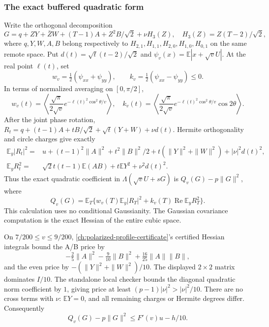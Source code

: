 \subsubsection{The exact buffered quadratic form}
Write the orthogonal decomposition
\[
 G=q+ZY+\bar ZW+(T-1)A+Z^2B/\sqrt2+\nu H_3(Z),\quad
 H_3(Z)=Z(T-2)/\sqrt2,
\]
where $q,Y,W,A,B$ belong respectively to
$H_{2,1},H_{1,1},H_{2,0},H_{1,0},H_{0,1}$ on the same remote space.
Put $d(t)=\sqrt t(t-2)/\sqrt2$ and
$\psi_v(x)=\mathbb E|x+\sqrt vU|$. At the real point $\ell(t)$, set
\[
 w_v=\tfrac12(\psi_{xx}+\psi_{yy}),\qquad
 k_v=\tfrac12(\psi_{xx}-\psi_{yy})\le0.
\]
In terms of normalized averaging on $[0,\pi/2]$,
\[
 w_v(t)=\left\langle\frac{\sqrt\pi}{2\sqrt v}
 e^{-\ell(t)^2\cos^2\theta/v}\right\rangle,
 \quad k_v(t)=\left\langle\frac{\sqrt\pi}{2\sqrt v}
 e^{-\ell(t)^2\cos^2\theta/v}\cos2\theta\right\rangle.
\]
After the joint phase rotation,
$R_t=q+(t-1)A+tB/\sqrt2+\sqrt t(Y+W)+\nu d(t)$.
Hermite orthogonality and circle charges give exactly
\begin{align*}
 \mathbb E_y|R_t|^2={}&u+(t-1)^2\|A\|^2+t^2\|B\|^2/2
 +t(\|Y\|^2+\|W\|^2)+|\nu|^2d(t)^2,\\
 \mathbb E_yR_t^2={}&\sqrt2t(t-1)\mathbb E(AB)+t\mathbb E Y^2
 +\nu^2d(t)^2.
\end{align*}
Thus the exact quadratic coefficient in
$\Lambda(\sqrt vU+sG)$ is $Q_v(G)-p\|G\|^2$, where
\[
 Q_v(G)=\mathbb E_T\{w_v(T)\mathbb E_y|R_T|^2+
 k_v(T)\operatorname{Re}\mathbb E_yR_T^2\}.
\]
This calculation uses no conditional Gaussianity. The Gaussian
covariance computation is the exact Hessian of the entire cubic space.

On $7/200\le v\le9/200$, \autoref{ch:polarized-profile-certificate}'s
certified Hessian integrals bound the A/B price by
\[
 -\tfrac25\|A\|^2-\tfrac9{10}\|B\|^2
 +\tfrac{16}{25}\|A\|\|B\|,
\]
and the even price by $-(\|Y\|^2+\|W\|^2)/10$.
The displayed $2\times2$ matrix dominates $I/10$.
The standalone local checker bounds the diagonal quadratic norm
coefficient by $1$, giving price at least $(p-1)|\nu|^2>|\nu|^2/10$.
There are no cross terms with $\nu$: $\mathbb EY=0$, and all remaining
charges or Hermite degrees differ. Consequently
\begin{equation}\label{eq:full-buffer-hessian}
 \boxed{Q_v(G)-p\|G\|^2\le F'(v)u-h/10.}
\end{equation}

